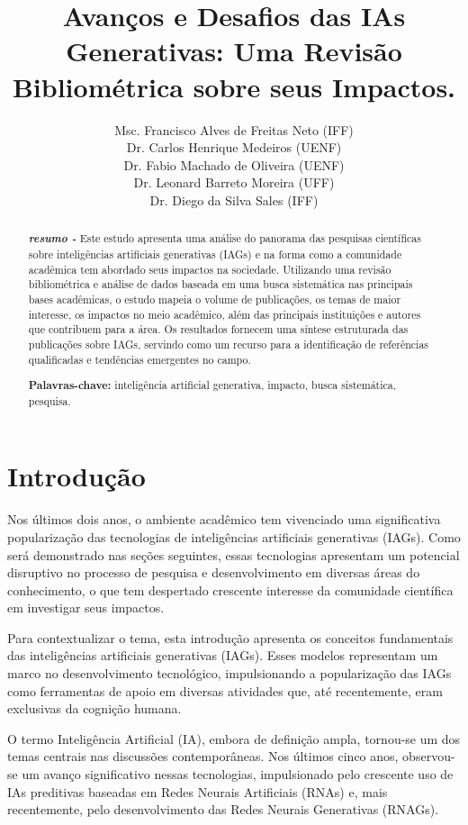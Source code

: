 \documentclass[openany,oneside,a4paper,9pt]{extarticle}
\title{Avanços e Desafios das IAs Generativas: Uma Revisão Bibliométrica sobre seus Impactos.}
\author{
        Msc. Francisco Alves de Freitas Neto (IFF)\\
	Dr. Carlos Henrique Medeiros (UENF)\\
        Dr. Fabio Machado de Oliveira (UENF)\\
        Dr. Leonard Barreto Moreira (UFF)\\
        Dr. Diego da Silva Sales (IFF)\\
        }
\begin{document}
\maketitle
\normalsize
\renewcommand{\abstractname}{}    %
\renewcommand{\absnamepos}{empty} %
\thispagestyle{fancy}
\begin{abstract}
\noindent \normalsize \textbf{\textit{resumo - }}
Este estudo apresenta uma análise do panorama das pesquisas científicas sobre inteligências artificiais generativas (IAGs) e na forma como a comunidade acadêmica tem abordado seus impactos na sociedade. Utilizando uma revisão bibliométrica e análise de dados baseada em uma busca sistemática nas principais bases acadêmicas, o estudo mapeia o volume de publicações, os temas de maior interesse, os impactos no meio acadêmico, além das principais instituições e autores que contribuem para a área. Os resultados fornecem uma síntese estruturada das publicações sobre IAGs, servindo como um recurso para a identificação de referências qualificadas e tendências emergentes no campo.
\par \vspace{0cm}
    \noindent \textbf{Palavras-chave: }inteligência artificial generativa, impacto, busca sistemática, pesquisa.
\end{abstract} 

\section{Introdução}
\onehalfspacing
Nos últimos dois anos, o ambiente acadêmico tem vivenciado uma significativa popularização das tecnologias de inteligências artificiais generativas (IAGs). Como será demonstrado nas seções seguintes, essas tecnologias apresentam um potencial disruptivo no processo de pesquisa e desenvolvimento em diversas áreas do conhecimento, o que tem despertado crescente interesse da comunidade científica em investigar seus impactos.

Para contextualizar o tema, esta introdução apresenta os conceitos fundamentais das inteligências artificiais generativas (IAGs). Esses modelos representam um marco no desenvolvimento tecnológico, impulsionando a popularização das IAGs como ferramentas de apoio em diversas atividades que, até recentemente, eram exclusivas da cognição humana.

O termo Inteligência Artificial (IA), embora de definição ampla, tornou-se um dos temas centrais nas discussões contemporâneas. Nos últimos cinco anos, observou-se um avanço significativo nessas tecnologias, impulsionado pelo crescente uso de IAs preditivas baseadas em Redes Neurais Artificiais (RNAs) e, mais recentemente, pelo desenvolvimento das Redes Neurais Generativas (RNAGs).
\end{document}
